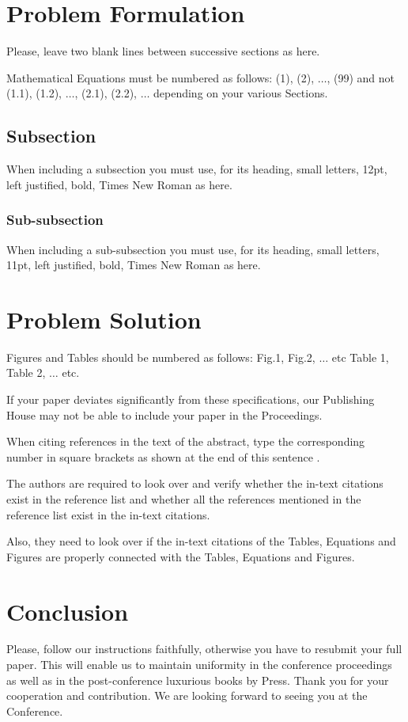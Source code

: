 \documentclass{wseas}
\begin{document}
\section{Problem Formulation}
Please, leave two blank lines between successive sections as here.

Mathematical Equations must be numbered as follows: (1), (2), $\ldots$, (99) and not (1.1), (1.2), $\ldots$, (2.1), (2.2), $\ldots$  depending on your various Sections.

\subsection{Subsection}
When including a subsection you must use, for its heading, small letters, 12pt, left justified, bold, Times New Roman as here.  
\break
\break
\break
\break
\break


\subsubsection{Sub-subsection}
When including a sub-subsection you must use, for its heading, small letters, 11pt, left justified, bold, Times New Roman as here. 

\section{Problem Solution}
Figures and Tables should be numbered as follows: Fig.1, Fig.2, $\ldots$ etc Table 1, Table 2, $\ldots$ etc.
\break

If your paper deviates significantly from these specifications, our Publishing House may not be able to include your paper in the Proceedings. 
\break

When citing references in the text of the abstract, type the corresponding number in square brackets as shown at the end of this sentence \cite{cite1}.  
\break

The authors are required to look over and verify whether the in-text citations exist in the reference list and whether all the references mentioned in the reference list exist in the in-text citations. 
\break

Also, they need to look over if the in-text citations of the Tables, Equations and Figures are properly connected with the Tables, Equations and Figures.

\section{Conclusion}
Please, follow our instructions faithfully, otherwise you have to resubmit your full paper.  This will \pagebreak  enable us to maintain uniformity in the conference proceedings as well as in the post-conference luxurious books by Press. Thank you for your cooperation and contribution. We are looking forward to seeing you at the Conference.
\end{document}
